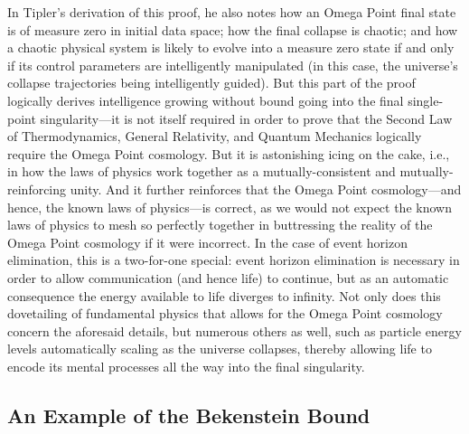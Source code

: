 \documentclass[letterpaper,12pt]{article}
\begin{document}
In Tipler's derivation of this proof, he also notes how an Omega Point final state is of measure zero in initial data space; how the final collapse is chaotic; and how a chaotic physical system is likely to evolve into a measure zero state if and only if its control parameters are intelligently manipulated (in this case, the universe's collapse trajectories being intelligently guided). But this part of the proof logically derives intelligence growing without bound going into the final single-point singularity---it is not itself required in order to prove that the Second Law of Thermodynamics, General Relativity, and Quantum Mechanics logically require the Omega Point cosmology. But it is astonishing icing on the cake, i.e., in how the laws of physics work together as a mutually-consistent and mutually-reinforcing unity. And it further reinforces that the Omega Point cosmology---and hence, the known laws of physics---is correct, as we would not expect the known laws of physics to mesh so perfectly together in buttressing the reality of the Omega Point cosmology if it were incorrect. In the case of event horizon elimination, this is a two-for-one special: event horizon elimination is necessary in order to allow communication (and hence life) to continue, but as an automatic consequence the energy available to life diverges to infinity. Not only does this dovetailing of fundamental physics that allows for the Omega Point cosmology concern the aforesaid details, but numerous others as well, such as particle energy levels automatically scaling as the universe collapses, thereby allowing life to encode its mental processes all the way into the final singularity.

\subsection{An Example of the Bekenstein Bound}
\label{subsec:ExampleBekensteinBound}
\end{document}
